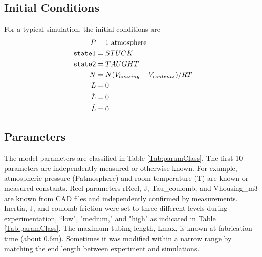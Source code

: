 \documentclass[letterpaper]{article}
\begin{document}
\subsection{Initial Conditions}
For a typical simulation, the initial conditions are
\begin{equation}
\begin{aligned}
  P &= 1 \; \mathrm{atmosphere}\\
  {\tt state1} &= STUCK \\
  {\tt state2} &= TAUGHT \\
  N &= N(V_{housing} - V_{contents}) / RT \\
  L &= 0\\
  \dot{L} &= 0\\
  \ddot{L} &= 0\\
\end{aligned}
\end{equation}

\subsection{Parameters}\label{Sec:Params}
The model parameters are classified in Table \ref{Tab:paramClass}.
The first 10 parameters are independently measured or otherwise known.  For example,
atmospheric pressure (Patmosphere) and room temperature (T) are known or
measured constants.
Reel parameters rReel, J, Tau\_coulomb, and Vhousing\_m3 are known from CAD files
and independently confirmed by measurements\cite{Lewis2024XX}.
Inertia, J, and coulomb friction were set to three different levels during
experimentation, ``low", "medium," and "high" as indicated in Table \ref{Tab:paramClass}.
The maximum tubing length, Lmax, is known at fabrication time (about 0.6m).
Sometimes it was modified within a narrow range  by matching the end length
between experiment and simulations.
\end{document}
